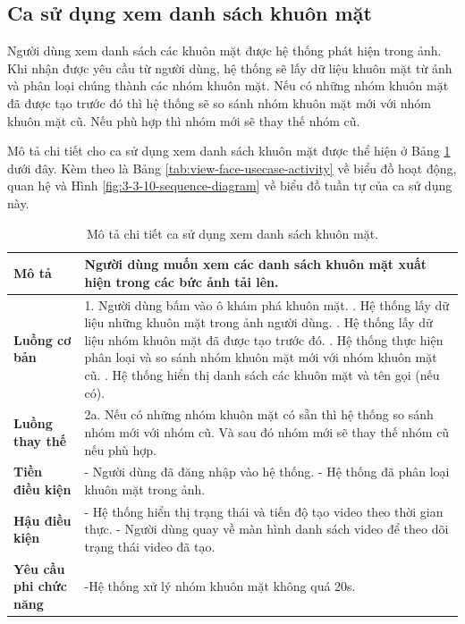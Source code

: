 \subsection{Ca sử dụng xem danh sách khuôn mặt}

Người dùng xem danh sách các khuôn mặt được hệ thống phát hiện trong ảnh. Khi nhận được yêu cầu từ người dùng, hệ thống sẽ lấy dữ liệu khuôn mặt từ ảnh và phân loại chúng thành các nhóm khuôn mặt. Nếu có những nhóm khuôn mặt đã được tạo trước đó thì hệ thống sẽ so sánh nhóm khuôn mặt mới với nhóm khuôn mặt cũ. Nếu phù hợp thì nhóm mới sẽ thay thế nhóm cũ.  

Mô tả chi tiết cho ca sử dụng xem danh sách khuôn mặt được thể hiện ở Bảng \ref{tab:view-face-usecase} dưới đây. Kèm theo là Bảng \ref{tab:view-face-usecase-activity} về biểu đồ hoạt động, quan hệ và Hình \ref{fig:3-3-10-sequence-diagram} về biểu đồ tuần tự của ca sử dụng này. 

\noindent 
\begin{table}[H]
\centering
\begin{tabularx}{\linewidth}{| l | X |} 
\hline 
\textbf{Mô tả} & Người dùng muốn xem các danh sách khuôn mặt xuất hiện trong các bức ảnh tải lên. \\
\hline 
\textbf{Luồng cơ bản} & 1. Người dùng bấm vào ô khám phá khuôn mặt. \newline
                       2. Hệ thống lấy dữ liệu những khuôn mặt trong ảnh người dùng. \newline
                       3. Hệ thống lấy dữ liệu nhóm khuôn mặt đã được tạo trước đó. \newline
                       4. Hệ thống thực hiện phân loại và so sánh nhóm khuôn mặt mới với nhóm khuôn mặt cũ. \newline
                       5. Hệ thống hiển thị danh sách các khuôn mặt và tên gọi (nếu có). \\
\hline
\textbf{Luồng thay thế} & 2a. Nếu có những nhóm khuôn mặt có sẵn thì hệ thống so sánh nhóm mới với nhóm cũ. Và sau đó nhóm mới sẽ thay thế nhóm cũ nếu phù hợp. \\
\hline
\textbf{Tiền điều kiện} & - Người dùng đã đăng nhập vào hệ thống. \newline
                           - Hệ thống đã phân loại khuôn mặt trong ảnh. \\
\textbf{Hậu điều kiện} & - Hệ thống hiển thị trạng thái và tiến độ tạo video theo thời gian thực. \newline
                         - Người dùng quay về màn hình danh sách video để theo dõi trạng thái video đã tạo. \\
\hline 
\textbf{Yêu cầu phi chức năng} & -Hệ thống xử lý nhóm khuôn mặt không quá 20s. \\
\hline 
\end{tabularx}
\caption{Mô tả chi tiết ca sử dụng xem danh sách khuôn mặt.}
\label{tab:view-face-usecase}
\end{table}

